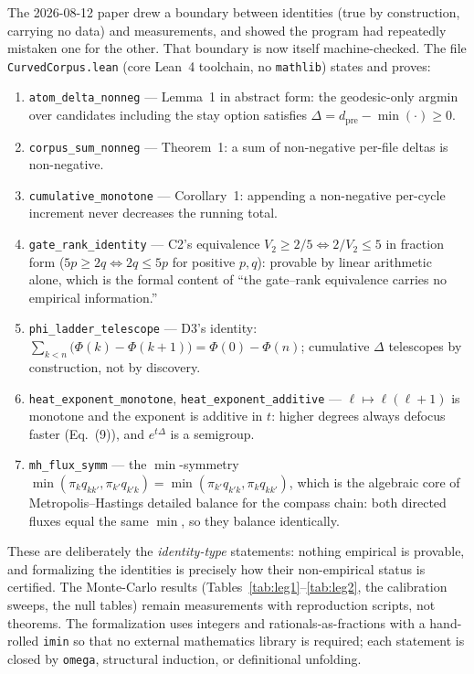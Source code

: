\documentclass[11pt,a4paper]{article}
\theoremstyle{plain}
\theoremstyle{remark}
\begin{document}
The 2026-08-12 paper drew a boundary between identities (true by construction, carrying no data) and measurements, and showed the program had repeatedly mistaken one for the other. That boundary is now itself machine-checked. The file \texttt{CurvedCorpus.lean} (core Lean~4 toolchain, no \texttt{mathlib}) states and proves:

\begin{enumerate}
\item \texttt{atom\_delta\_nonneg} --- Lemma~1 in abstract form: the geodesic-only argmin over candidates including the stay option satisfies $\Delta=d_{\mathrm{pre}}-\min(\cdot)\ge0$.
\item \texttt{corpus\_sum\_nonneg} --- Theorem~1: a sum of non-negative per-file deltas is non-negative.
\item \texttt{cumulative\_monotone} --- Corollary~1: appending a non-negative per-cycle increment never decreases the running total.
\item \texttt{gate\_rank\_identity} --- C2's equivalence $V_2\ge2/5\iff2/V_2\le5$ in fraction form ($5p\ge2q\iff2q\le5p$ for positive $p,q$): provable by linear arithmetic alone, which is the formal content of ``the gate--rank equivalence carries no empirical information.''
\item \texttt{phi\_ladder\_telescope} --- D3's identity: $\sum_{k<n}\big(\Phi(k)-\Phi(k{+}1)\big)=\Phi(0)-\Phi(n)$; cumulative $\Delta$ telescopes by construction, not by discovery.
\item \texttt{heat\_exponent\_monotone}, \texttt{heat\_exponent\_additive} --- $\ell\mapsto\ell(\ell+1)$ is monotone and the exponent is additive in $t$: higher degrees always defocus faster (Eq.~(9)), and $e^{t\Delta}$ is a semigroup.
\item \texttt{mh\_flux\_symm} --- the $\min$-symmetry $\min(\pi_kq_{kk'},\pi_{k'}q_{k'k})=\min(\pi_{k'}q_{k'k},\pi_kq_{kk'})$, which is the algebraic core of Metropolis--Hastings detailed balance for the compass chain: both directed fluxes equal the same $\min$, so they balance identically.
\end{enumerate}

These are deliberately the \emph{identity-type} statements: nothing empirical is provable, and formalizing the identities is precisely how their non-empirical status is certified. The Monte-Carlo results (Tables~\ref{tab:leg1}--\ref{tab:leg2}, the calibration sweeps, the null tables) remain measurements with reproduction scripts, not theorems. The formalization uses integers and rationals-as-fractions with a hand-rolled \texttt{imin} so that no external mathematics library is required; each statement is closed by \texttt{omega}, structural induction, or definitional unfolding.
\end{document}
